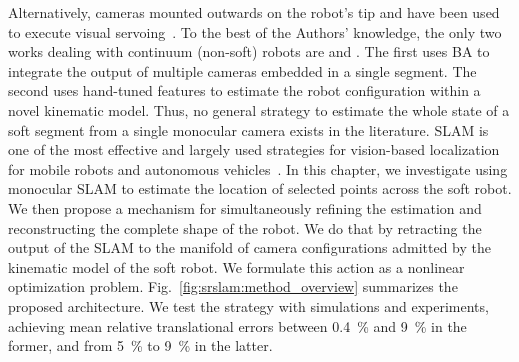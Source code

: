 %
%
%
%
%
%
%
Alternatively, cameras mounted outwards on the robot's tip and have been used to execute visual servoing~\cite{homberg2019robust}.
%
To the best of the Authors' knowledge, the only two works dealing with continuum (non-soft) robots are \cite{weber2012multi} and \cite{cheng2020approximate}.
% 
The first uses \gls{BA} to integrate the output of multiple cameras embedded in a single segment. The second uses hand-tuned features to estimate the robot configuration within a novel kinematic model. Thus, no general strategy to estimate the whole state of a soft segment from a single monocular camera exists in the literature.
%
\gls{SLAM} is one of the most effective and largely used strategies for vision-based localization for mobile robots and autonomous vehicles~\cite{fuentes2015visual,mur2017orb}. %
%
In this chapter, we investigate using monocular \gls{SLAM} to estimate the location of selected points across the soft robot. We then propose a mechanism for simultaneously refining the estimation and reconstructing the complete shape of the robot. We do that by retracting the output of the \gls{SLAM} to the manifold of camera configurations admitted by the kinematic model of the soft robot. We formulate this action as a nonlinear optimization problem. Fig.~\ref{fig:srslam:method_overview} summarizes the proposed architecture. We test the strategy with simulations and experiments, achieving mean relative translational errors between \SI{0.4}{\percent} and \SI{9}{\percent} in the former, and from \SI{5}{\percent} to \SI{9}{\percent} in the latter.

